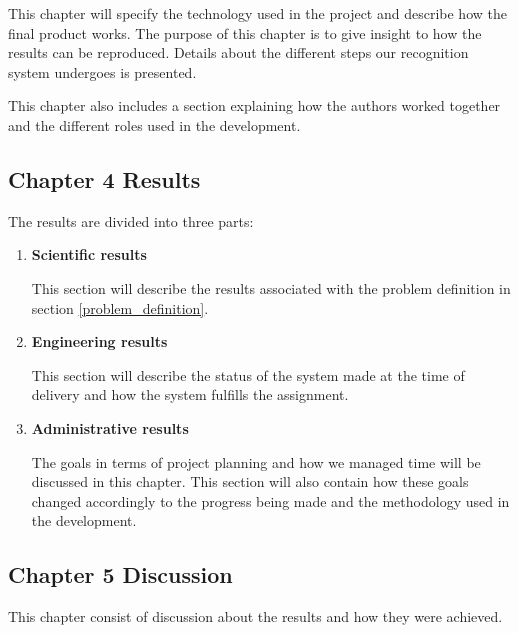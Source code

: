 This chapter will specify the technology used in the project and describe how the final product works. The purpose of this chapter is to give insight to how the results can be reproduced. Details about the different steps our recognition system undergoes is presented. 

This chapter also includes a section explaining how the authors worked together and the different roles used in the development.

\subsection{Chapter 4 Results}
The results are divided into three parts:
\begin{enumerate}
    \item \textbf{Scientific results}
    
    This section will describe the results associated with the problem definition in section \ref{problem_definition}.
    
    \item \textbf{Engineering results}
    
    This section will describe the status of the system made at the time of delivery and how the system fulfills the assignment.
    
    \item \textbf{Administrative results}
    
    The goals in terms of project planning and how we managed time will be discussed in this chapter. This section will also contain how these goals changed accordingly to the progress being made and the methodology used in the development.
    
\end{enumerate}

\subsection{Chapter 5 Discussion}
This chapter consist of discussion about the results and how they were achieved.

